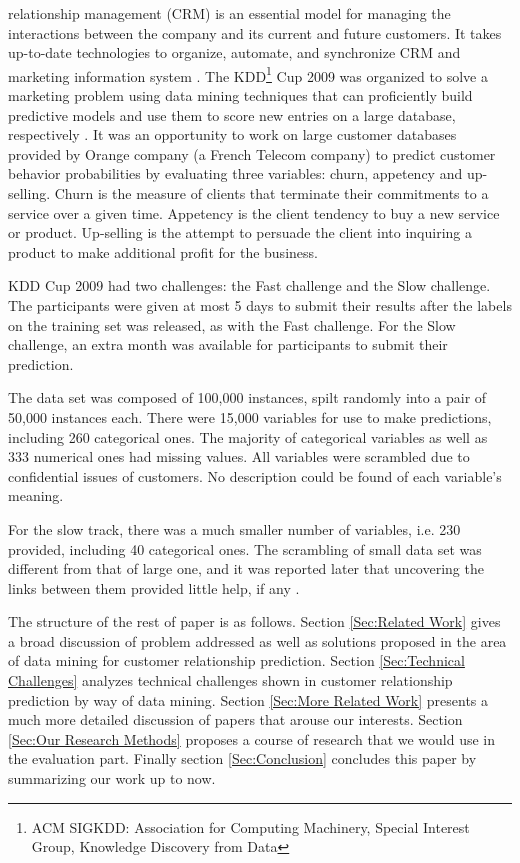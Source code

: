 \documentclass[journal]{IEEEtran}
\begin{document}
 relationship management (CRM) is an essential model for managing the interactions between the company and its current and future customers. It takes up-to-date technologies to organize, automate, and synchronize CRM and marketing information system \cite{Ref:CustomerRelationshipManagement}. The KDD\footnote{ACM SIGKDD: Association for Computing Machinery, Special Interest Group, Knowledge Discovery from Data} Cup 2009 was organized to solve a marketing problem using data mining techniques that can proficiently build predictive models and use them to score new entries on a large database, respectively \cite{Ref:KDDCup2009}. It was an opportunity to work on large customer databases provided by Orange company (a French Telecom company) to predict customer behavior probabilities by evaluating three variables: churn, appetency and up-selling. Churn is the measure of clients that terminate their commitments to a service over a given time. Appetency is the client tendency to buy a new service or product. Up-selling is the attempt to persuade the client into inquiring a product to make additional profit for the business.
\par
KDD Cup 2009 had two challenges: the Fast challenge and the Slow challenge. The participants were given at most 5 days to submit their results after the labels on the training set was released, as with the Fast challenge. For the Slow challenge, an extra month was available for participants to submit their prediction.
\par
The data set was composed of 100,000 instances, spilt randomly into a pair of 50,000 instances each. There were 15,000 variables for use to make predictions, including 260 categorical ones. The majority of categorical variables as well as 333 numerical ones had missing values. All variables were scrambled due to confidential issues of customers. No description could be found of each variable's meaning.
\par
For the slow track, there was a much smaller number of variables, i.e. 230 provided, including 40 categorical ones. The scrambling of small data set was different from that of large one, and it was reported later that uncovering the links between them provided little help, if any \cite{Ref:WinningtheKDDCupIBMResearch}.
\par
The structure of the rest of paper is as follows. Section \ref{Sec:Related Work} gives a broad discussion of problem addressed as well as solutions proposed in the area of data mining for customer relationship prediction. Section \ref{Sec:Technical Challenges} analyzes technical challenges shown in customer relationship prediction by way of data mining. Section \ref{Sec:More Related Work} presents a much more detailed discussion of papers that arouse our interests. Section \ref{Sec:Our Research Methods} proposes a course of research that we would use in the evaluation part. Finally section \ref{Sec:Conclusion} concludes this paper by summarizing our work up to now.
\end{document}
